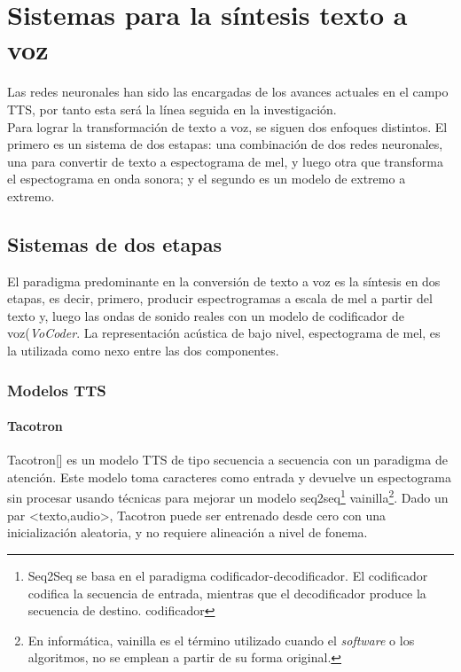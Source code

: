 \chapter{Sistemas para la síntesis texto a voz}\label{chapter:state-of-the-art}

Las redes neuronales han sido las encargadas de los avances actuales en el campo TTS, por tanto esta será la línea seguida en la investigación. \\

Para lograr la transformación de texto a voz, se siguen dos enfoques distintos. El primero es un sistema de dos estapas: una combinación de dos redes neuronales, una para convertir de texto a espectograma de mel, y luego otra que transforma el espectograma en onda sonora; y el segundo es un modelo de extremo a extremo.  

\section{Sistemas de dos etapas}

El paradigma predominante en la conversión de texto a voz es la síntesis en dos etapas, es decir, primero, producir espectrogramas a escala de mel a partir del texto y, luego las ondas de sonido reales con un modelo de codificador de voz(\textit{VoCoder}. La representación acústica de bajo nivel, espectograma de mel, es la utilizada como nexo entre las dos componentes.


\subsection{Modelos TTS}

\subsubsection{Tacotron}

Tacotron[\cite{wang2017tacotron}] es un modelo TTS de tipo secuencia a secuencia con un paradigma de atención. Este modelo toma caracteres como entrada y devuelve un espectograma sin procesar usando técnicas para mejorar un modelo seq2seq\footnote{Seq2Seq se basa en el paradigma codificador-decodificador. El codificador codifica la secuencia de entrada, mientras que el decodificador produce la secuencia de destino. codificador} vainilla\footnote{En informática, vainilla es el término utilizado cuando el \textit{software} o los algoritmos, no se emplean a partir de su forma original.}. Dado un par <texto,audio>, Tacotron puede ser entrenado desde cero con una inicialización aleatoria, y no requiere alineación a nivel de fonema.\\

